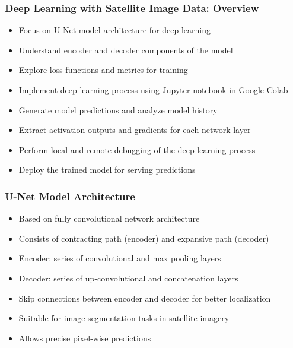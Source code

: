 \begin{frame}[fragile]\frametitle{Deep Learning with Satellite Image Data: Overview}
\begin{itemize}
\item Focus on U-Net model architecture for deep learning
\item Understand encoder and decoder components of the model
\item Explore loss functions and metrics for training
\item Implement deep learning process using Jupyter notebook in Google Colab
\item Generate model predictions and analyze model history
\item Extract activation outputs and gradients for each network layer
\item Perform local and remote debugging of the deep learning process
\item Deploy the trained model for serving predictions
\end{itemize}
\end{frame}

\begin{frame}[fragile]\frametitle{U-Net Model Architecture}
\begin{itemize}
\item Based on fully convolutional network architecture
\item Consists of contracting path (encoder) and expansive path (decoder)
\item Encoder: series of convolutional and max pooling layers
\item Decoder: series of up-convolutional and concatenation layers
\item Skip connections between encoder and decoder for better localization
\item Suitable for image segmentation tasks in satellite imagery
\item Allows precise pixel-wise predictions
\end{itemize}
\end{frame}

